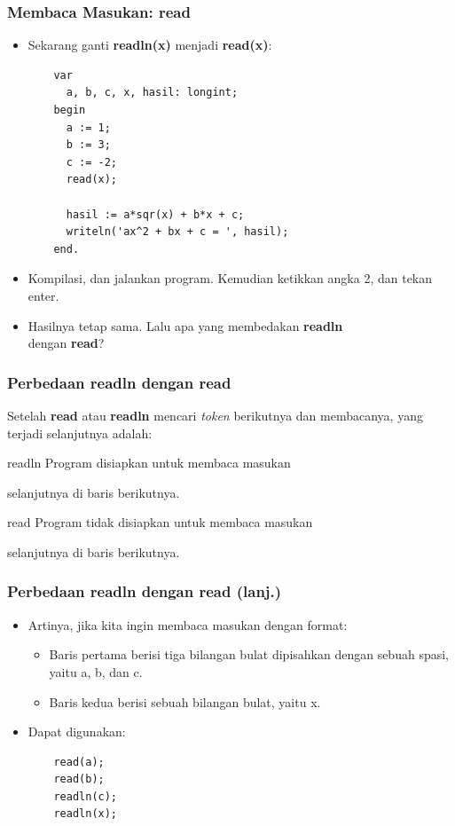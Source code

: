 \begin{frame}[fragile]
\frametitle{Membaca Masukan: read}
\begin{itemize}
  \item Sekarang ganti \textbf{readln(x)} menjadi \textbf{read(x)}:
  \begin{lstlisting}
    var
      a, b, c, x, hasil: longint;
    begin
      a := 1;
      b := 3;
      c := -2;
      read(x);

      hasil := a*sqr(x) + b*x + c;
      writeln('ax^2 + bx + c = ', hasil);
    end.
  \end{lstlisting}
  \item Kompilasi, dan jalankan program. Kemudian ketikkan angka 2, dan tekan enter.
  \item Hasilnya tetap sama. Lalu apa yang membedakan \textbf{readln} \\ dengan \textbf{read}?
\end{itemize}
\end{frame}

\begin{frame}[fragile]
\frametitle{Perbedaan readln dengan read}
Setelah \textbf{read} atau \textbf{readln} mencari \textit{token} berikutnya dan membacanya, yang terjadi selanjutnya adalah:
\begin{block}{readln}
  Program disiapkan untuk membaca masukan
   
  selanjutnya di \alert{baris berikutnya}.
\end{block}
\begin{block}{read}
  Program \alert{tidak} disiapkan untuk membaca masukan 
  
  selanjutnya di \alert{baris berikutnya}.
\end{block}
\end{frame}

\begin{frame}[fragile]
\frametitle{Perbedaan readln dengan read (lanj.)}
\begin{itemize}
  \item Artinya, jika kita ingin membaca masukan dengan format:
  \begin{itemize}
    \item Baris pertama berisi tiga bilangan bulat dipisahkan dengan sebuah spasi, yaitu a, b, dan c.
    \item Baris kedua berisi sebuah bilangan bulat, yaitu x.
  \end{itemize}
  \item Dapat digunakan:
  \begin{lstlisting}
    read(a);
    read(b);
    readln(c);
    readln(x);
  \end{lstlisting}
\end{itemize}
\end{frame}

